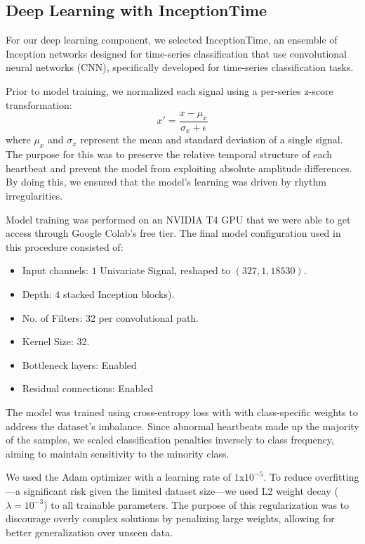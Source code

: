 \subsection{Deep Learning with InceptionTime}

For our deep learning component, we selected InceptionTime, an ensemble of Inception networks designed for time-series classification that use convolutional neural networks (CNN), specifically developed for time-series classification tasks.

Prior to model training, we normalized each signal using a per-series z-score transformation:
$$x' = \frac{x-\mu_x}{\sigma_x + \epsilon}$$
where $\mu_x$ and $\sigma_x$ represent the mean and standard deviation of a single signal. The purpose for this was to preserve the relative temporal structure of each heartbeat and prevent the model from exploiting absolute amplitude differences. By doing this, we ensured that the model's learning was driven by rhythm irregularities. 

Model training was performed on an NVIDIA T4 GPU that we were able to get access through Google Colab's free tier. The final model configuration used in this procedure consisted of:
\begin{itemize}
    \item Input channels: $1$ Univariate Signal, reshaped to $(327, 1, 18530)$.
    \item Depth: 4 stacked Inception blocks).
    \item No. of Filters: 32 per convolutional path.
    \item Kernel Size: 32.
    \item Bottleneck layers: Enabled
    \item Residual connections: Enabled
\end{itemize}

The model was trained using cross-entropy loss with with class-specific weights to address the dataset's imbalance. Since abnormal heartbeats made up the majority of the samples, we scaled classification penalties inversely to class frequency, aiming to maintain sensitivity to the minority class.

We used the Adam optimizer with a learning rate of $1$x$10^{-5}$. To reduce overfitting—a significant risk given the limited dataset size—we used L2 weight decay ($\lambda=10^{-3}$) to all trainable parameters. The purpose of this regularization was to discourage overly complex solutions by penalizing large weights, allowing for better generalization over unseen data.

